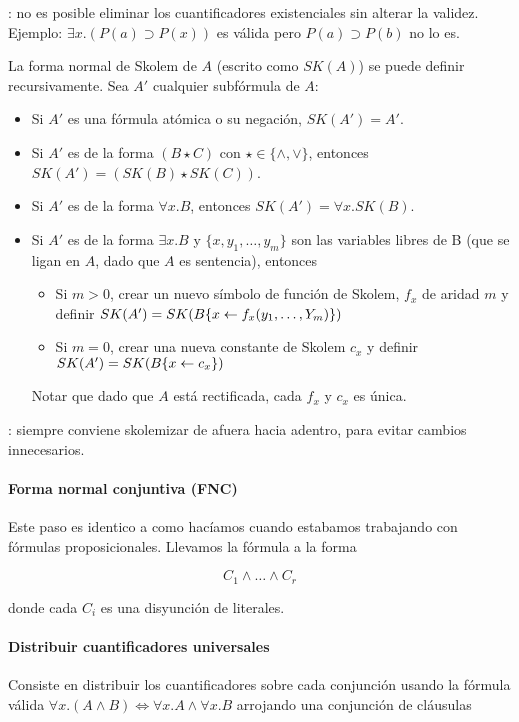 : no es posible eliminar los cuantificadores existenciales sin alterar la validez. Ejemplo: $\exists x. (P(a) \supset P(x))$ es válida pero $P(a) \supset P(b)$ no lo es.

La forma normal de Skolem de $A$ (escrito como $SK(A)$) se puede definir recursivamente. Sea $A'$ cualquier subfórmula de $A$:
\begin{itemize}
  \item Si $A'$ es una fórmula atómica o su negación, $SK(A') = A'$.
  \item Si $A'$ es de la forma $(B \star C)$ con $\star \in \{\land, \lor\}$, entonces $SK(A') = (SK(B) \star SK(C))$.
  \item Si $A'$ es de la forma $\forall x.B$, entonces $SK(A') = \forall x.SK(B)$.
  \item Si $A'$ es de la forma $\exists x.B$ y $\{x, y_1, \dots, y_m\}$ son las variables libres de B (que se ligan en $A$, dado que $A$ es sentencia), entonces
    \begin{itemize}
      \item Si $m > 0$, crear un nuevo símbolo de función de Skolem, $f_x$ de aridad $m$ y definir $SK(A') = SK(B\{x \leftarrow f_x(y_1, \dots, Y_m)\})$
      \item Si $m = 0$, crear una nueva constante de Skolem $c_x$ y definir $SK(A') = SK(B\{x \leftarrow c_x\})$
    \end{itemize}
    Notar que dado que $A$ está rectificada, cada $f_x$ y $c_x$ es única.
\end{itemize}

: siempre conviene skolemizar de afuera hacia adentro, para evitar cambios innecesarios.

\paragraph{Forma normal conjuntiva (FNC)}

Este paso es identico a como hacíamos cuando estabamos trabajando con fórmulas proposicionales. Llevamos la fórmula a la forma

\[C_1 \land \dots \land C_r\]

 donde cada $C_i$ es una disyunción de literales.

\paragraph{Distribuir cuantificadores universales}

Consiste en distribuir los cuantificadores sobre cada conjunción usando la fórmula válida $\forall x.(A\land B) \iff \forall x. A \land \forall x. B$ arrojando una conjunción de cláusulas


